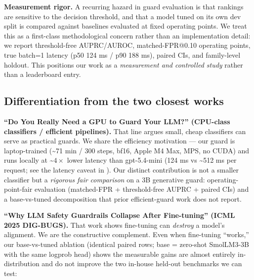 \documentclass[sigconf,nonacm]{acmart}
\begin{document}
\textbf{Measurement rigor.} A recurring hazard in guard evaluation is that rankings are sensitive to the decision threshold, and that a model tuned on its own dev split is compared against baselines evaluated at fixed operating points. We treat this as a first-class methodological concern rather than an implementation detail: we report threshold-free AUPRC/AUROC, matched-FPR@0.10 operating points, true batch=1 latency (p50 124 ms / p90 188 ms), paired CIs, and family-level holdout. This positions our work as a \emph{measurement and controlled study} rather than a leaderboard entry.

\subsection{Differentiation from the two closest works}

\textbf{``Do You Really Need a GPU to Guard Your LLM?'' \cite{majhi2025gpuguard} (CPU-class classifiers / efficient pipelines).} That line argues small, cheap classifiers can serve as practical guards. We share the efficiency motivation --- our guard is laptop-trained (\textasciitilde{}71 min / 300 steps, bf16, Apple M4 Max, MPS, no CUDA) and runs locally at \textasciitilde{}$4\times$ lower latency than gpt-5.4-mini (124 ms vs \textasciitilde{}512 ms per request; see the latency caveat in ). Our distinct contribution is not a smaller classifier but a \emph{rigorous fair comparison} on a 3B generative guard: operating-point-fair evaluation (matched-FPR + threshold-free AUPRC + paired CIs) and a base-vs-tuned decomposition that prior efficient-guard work does not report.

\textbf{``Why LLM Safety Guardrails Collapse After Fine-tuning'' \cite{hsiung2025guardrails} (ICML 2025 DIG-BUGS).} That work shows fine-tuning can \emph{destroy} a model's alignment. We are the constructive complement. Even when fine-tuning ``works,'' our base-vs-tuned ablation (identical paired rows; base = zero-shot SmolLM3-3B with the same logprob head) shows the measurable gains are almost entirely in-distribution and do not improve the two in-house held-out benchmarks we can test:
\end{document}

